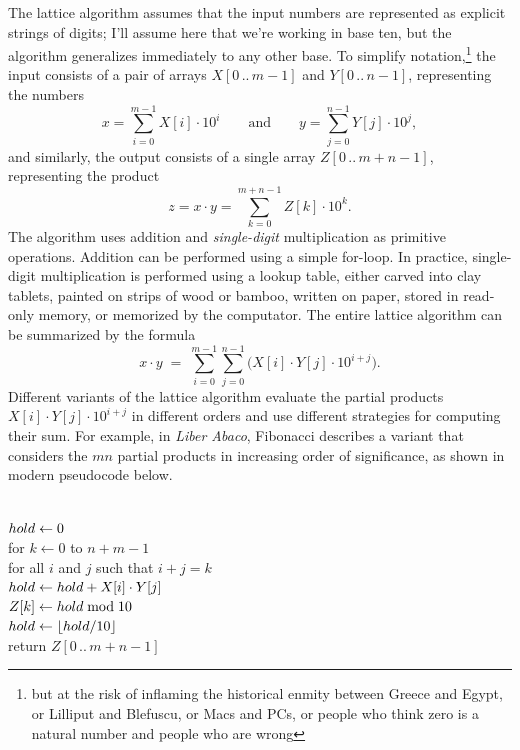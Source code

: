 The lattice algorithm assumes that the input numbers are represented as explicit strings of digits; I’ll assume here that we’re working in base ten, but the algorithm generalizes immediately to any other base. To simplify notation,\footnote{but at the risk of inflaming the historical enmity between Greece and Egypt, or Lilliput and Blefuscu, or Macs and PCs, or people who think zero is a natural number and people who are wrong} the input consists of a pair of arrays $X[0\,..\,m-1]$ and $Y[0\,..\,n-1]$, representing the numbers
\[
x = \sum_{i=0}^{m-1} X[i] \cdot 10^i
\qquad \text{and} \qquad
y = \sum_{j=0}^{n-1} Y[j] \cdot 10^j,
\]
and similarly, the output consists of a single array $Z[0\,..\,m+n-1]$, representing the product
\[
z = x \cdot y = \sum_{k=0}^{m+n-1} Z[k] \cdot 10^k.
\]
The algorithm uses addition and \textit{single-digit} multiplication as primitive operations. Addition can be performed using a simple for-loop. In practice, single-digit multiplication is performed using a lookup table, either carved into clay tablets, painted on strips of wood or bamboo, written on paper, stored in read-only memory, or memorized by the computator. The entire lattice algorithm can be summarized by the formula
\[
x \cdot y \;=\; \sum_{i=0}^{m-1} \sum_{j=0}^{n-1} \bigl( X[i] \cdot Y[j] \cdot 10^{i+j} \bigr).
\]
Different variants of the lattice algorithm evaluate the partial products $X[i] \cdot Y[j] \cdot 10^{i+j}$ in different orders and use different strategies for computing their sum. For example, in \textit{Liber Abaco}, Fibonacci describes a variant that considers the $mn$ partial products in increasing order of significance, as shown in modern pseudocode below.

\begin{pseudocode}
\\
$hold \gets 0$\\
for $k \gets 0$ to $n+m-1$\\
\Indent for all $i$ and $j$ such that $i + j = k$\\
\Indent\Indent $hold \gets hold + X[i] \cdot Y[j]$\\
\Indent $Z[k] \gets hold \bmod 10$\\
\Indent $hold \gets \lfloor hold/10 \rfloor$\\
return $Z[0\,..\,m+n-1]$
\end{pseudocode}


